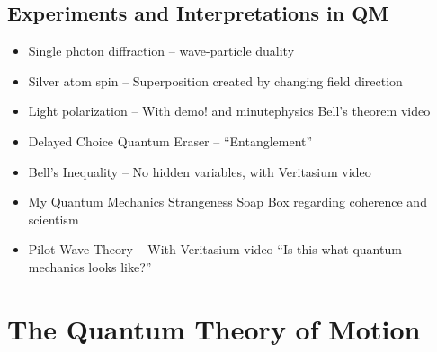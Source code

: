 \documentclass[12pt, openany, letterpaper]{memoir}
\begin{document}
\section*{Experiments and Interpretations in QM}
\begin{itemize}
	\item Single photon diffraction -- wave-particle duality
	\item Silver atom spin -- Superposition created by changing field direction
	\item Light polarization -- With demo! and minutephysics Bell's theorem video
	\item Delayed Choice Quantum Eraser -- “Entanglement”
	\item Bell's Inequality  -- No hidden variables, with Veritasium video
	\item My Quantum Mechanics Strangeness Soap Box regarding coherence and scientism
	\item Pilot Wave Theory -- With Veritasium video “Is this what quantum mechanics looks like?”
\end{itemize}

\chapter{The Quantum Theory of Motion}
\end{document}
